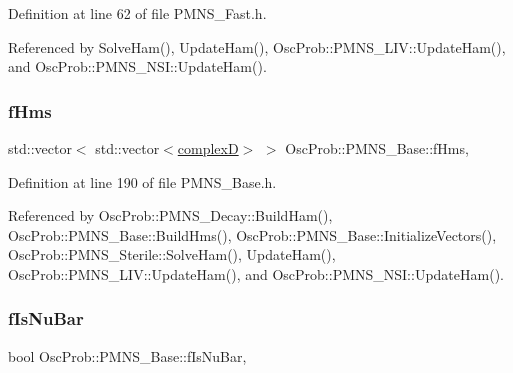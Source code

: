Definition at line 62 of file P\+M\+N\+S\+\_\+\+Fast.\+h.



Referenced by Solve\+Ham(), Update\+Ham(), Osc\+Prob\+::\+P\+M\+N\+S\+\_\+\+L\+I\+V\+::\+Update\+Ham(), and Osc\+Prob\+::\+P\+M\+N\+S\+\_\+\+N\+S\+I\+::\+Update\+Ham().

\mbox{\label{classOscProb_1_1PMNS__Base_acd3c8783e7603081eab316ea4c86c766}} 
\subsubsection{\texorpdfstring{f\+Hms}{fHms}}
{\footnotesize\ttfamily std\+::vector$<$ std\+::vector$<$\hyperlink{EigenPoint_8h_a67ca8e107e20610c3fff78d5e726ece0}{complexD}$>$ $>$ Osc\+Prob\+::\+P\+M\+N\+S\+\_\+\+Base\+::f\+Hms\hspace{0.3cm}{\ttfamily [protected]}, {\ttfamily [inherited]}}



Definition at line 190 of file P\+M\+N\+S\+\_\+\+Base.\+h.



Referenced by Osc\+Prob\+::\+P\+M\+N\+S\+\_\+\+Decay\+::\+Build\+Ham(), Osc\+Prob\+::\+P\+M\+N\+S\+\_\+\+Base\+::\+Build\+Hms(), Osc\+Prob\+::\+P\+M\+N\+S\+\_\+\+Base\+::\+Initialize\+Vectors(), Osc\+Prob\+::\+P\+M\+N\+S\+\_\+\+Sterile\+::\+Solve\+Ham(), Update\+Ham(), Osc\+Prob\+::\+P\+M\+N\+S\+\_\+\+L\+I\+V\+::\+Update\+Ham(), and Osc\+Prob\+::\+P\+M\+N\+S\+\_\+\+N\+S\+I\+::\+Update\+Ham().

\mbox{\label{classOscProb_1_1PMNS__Base_a0ebaeaefab36a3ff381c6293faedfdd6}} 
\subsubsection{\texorpdfstring{f\+Is\+Nu\+Bar}{fIsNuBar}}
{\footnotesize\ttfamily bool Osc\+Prob\+::\+P\+M\+N\+S\+\_\+\+Base\+::f\+Is\+Nu\+Bar\hspace{0.3cm}{\ttfamily [protected]}, {\ttfamily [inherited]}}




